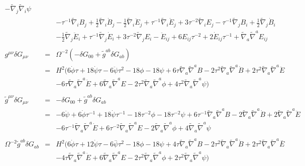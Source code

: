 \documentclass[10pt,letterpaper]{article}
\numberwithin{equation}{section}
\begin{document}
\begin{eqnarray}
-  \tilde{\nabla}_{j}\tilde{\nabla}_{i}\psi
\nonumber\\
&&- \tau^{-1} \tilde{\nabla}_{i}B_{j}
+ \tfrac{1}{2} \tilde{\nabla}_{i}\dot{B}_{j}
-  \tfrac{1}{2} \tilde{\nabla}_{i}\ddot{E}_{j}
+ \tau^{-1} \tilde{\nabla}_{i}\dot{E}_{j}
+ 3 \tau^{-2} \tilde{\nabla}_{i}E_{j}
-  \tau^{-1} \tilde{\nabla}_{j}B_{i}
+ \tfrac{1}{2} \tilde{\nabla}_{j}\dot{B}_{i}\nonumber\\
&& -  \tfrac{1}{2} \tilde{\nabla}_{j}\ddot{E}_{i}
+ \tau^{-1} \tilde{\nabla}_{j}\dot{E}_{i}
+ 3 \tau^{-2} \tilde{\nabla}_{j}E_{i}
- \ddot{E}_{ij}
+ 6 E_{ij} \tau^{-2}
+ 2 \dot{E}_{ij} \tau^{-1}
+ \tilde{\nabla}_{a}\tilde{\nabla}^{a}E_{ij}
\\ \nonumber\\
g^{\mu\nu}\delta G_{\mu\nu}&=& \Omega^{-2}(-\delta G_{00} + \tilde g^{ab}\delta G_{ab})
\nonumber\\
&=&H^2\bigg( 6 \dot{\phi} \tau
+ 18 \dot{\psi} \tau
- 6 \ddot{\psi} \tau^2
- 18 \phi
- 18 \psi
+ 6 \tau \tilde{\nabla}_{a}\tilde{\nabla}^{a}B
- 2 \tau^2 \tilde{\nabla}_{a}\tilde{\nabla}^{a}\dot{B}
+ 2 \tau^2 \tilde{\nabla}_{a}\tilde{\nabla}^{a}\ddot{E}\nonumber\\
&& - 6 \tau \tilde{\nabla}_{a}\tilde{\nabla}^{a}\dot{E}
+ 6 \tilde{\nabla}_{a}\tilde{\nabla}^{a}E
- 2 \tau^2 \tilde{\nabla}_{a}\tilde{\nabla}^{a}\phi
+ 4 \tau^2 \tilde{\nabla}_{a}\tilde{\nabla}^{a}\psi\bigg)
\\ \nonumber\\
\tilde g^{\mu\nu}\delta G_{\mu\nu}&=& -\delta G_{00} + \tilde g^{ab}\delta G_{ab}
\nonumber\\
&=&-6 \ddot{\psi}
+ 6 \dot{\phi} \tau^{-1}
+ 18 \dot{\psi} \tau^{-1}
- 18 \tau^{-2} \phi
- 18 \tau^{-2} \psi
+ 6 \tau^{-1} \tilde{\nabla}_{a}\tilde{\nabla}^{a}B
- 2 \tilde{\nabla}_{a}\tilde{\nabla}^{a}\dot{B}
+ 2 \tilde{\nabla}_{a}\tilde{\nabla}^{a}\ddot{E}\nonumber\\
&& - 6 \tau^{-1} \tilde{\nabla}_{a}\tilde{\nabla}^{a}\dot{E}
+ 6 \tau^{-2} \tilde{\nabla}_{a}\tilde{\nabla}^{a}E
- 2 \tilde{\nabla}_{a}\tilde{\nabla}^{a}\phi
+ 4 \tilde{\nabla}_{a}\tilde{\nabla}^{a}\psi
\\ \nonumber\\
\Omega^{-2}\tilde g^{ab}\delta G_{ab} &=& H^2\bigg(
6 \dot{\phi} \tau
+ 12 \dot{\psi} \tau
- 6 \overset{..}{\psi} \tau^2
- 18 \phi
- 18 \psi
+ 4 \tau \tilde{\nabla}_{a}\tilde{\nabla}^{a}B
- 2 \tau^2 \tilde{\nabla}_{a}\tilde{\nabla}^{a}\dot{B}
+ 2 \tau^2 \tilde{\nabla}_{a}\tilde{\nabla}^{a}\overset{..}{E}\nonumber\\
&& - 4 \tau \tilde{\nabla}_{a}\tilde{\nabla}^{a}\dot{E}
+ 6 \tilde{\nabla}_{a}\tilde{\nabla}^{a}E
- 2 \tau^2 \tilde{\nabla}_{a}\tilde{\nabla}^{a}\phi
+ 2 \tau^2 \tilde{\nabla}_{a}\tilde{\nabla}^{a}\psi\bigg)
\end{eqnarray}
\end{document}
